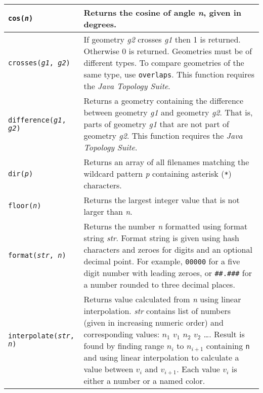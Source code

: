 \begin{longtable}{|p{5cm}|p{7cm}|}
\hline

\texttt{cos(\textit{n})} &
Returns the cosine of angle \textit{n}, given in degrees. \\

\hline

\texttt{crosses(\textit{g1}, \textit{g2})} &
If geometry \textit{g2} crosses \textit{g1} then
1 is returned.  Otherwise 0 is returned.
Geometries must be of different types.  To compare
geometries of the same type, use \texttt{overlaps}.
This function requires the \textit{Java Topology Suite}. \\

\hline

\texttt{difference(\textit{g1}, \textit{g2})} &
Returns a geometry containing the difference between
geometry \textit{g1} and geometry \textit{g2}.  That is, parts
of geometry \textit{g1} that are not part of geometry \textit{g2}.
This function requires the \textit{Java Topology Suite}. \\

\hline

\texttt{dir(\textit{p})} &
Returns an array of all filenames matching the wildcard
pattern \textit{p} containing asterisk (\texttt{*}) characters. \\

\hline

\texttt{floor(\textit{n})} &
Returns the largest integer value that is not larger than \textit{n}. \\

\hline

\texttt{format(\textit{str}, \textit{n})} &
Returns the number \textit{n} formatted using format string \textit{str}.
Format string is given using hash characters and zeroes for digits
and an optional decimal point.
For example,
\texttt{00000} for a five digit number with leading zeroes,
or
\texttt{\#\#.\#\#\#} for a number rounded to three decimal places.  \\

\hline

\texttt{interpolate(\textit{str}, \textit{n})} &
Returns value calculated from \textit{n} using linear interpolation.
\textit{str} contains list of numbers (given in increasing numeric
order) and corresponding values:
$n_{1}$ $v_{1}$ $n_{2}$ $v_{2}$ \ldots.
Result is found by finding range
$n_{i}$
to
$n_{i+1}$
containing \texttt{n} and
using linear interpolation to calculate a value between
$v_{i}$
and
$v_{i+1}$.
Each value $v_{i}$ is either a number or a named color.  \\


\end{longtable}
